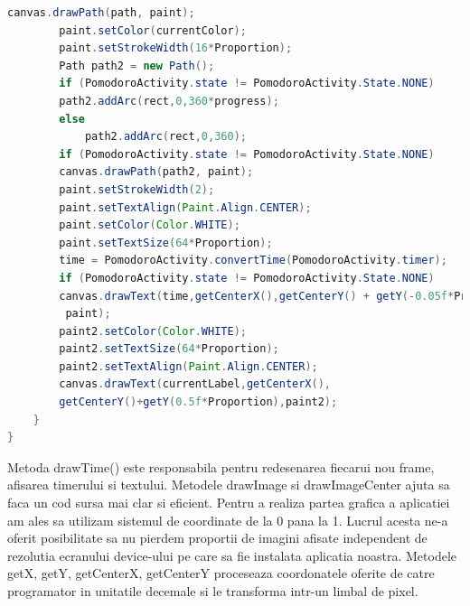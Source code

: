 \documentclass[12pt]{article}
\begin{document}
\begin{lstlisting}[language=java, caption={Fisierul TimeControl.java}, label=list2]
        canvas.drawPath(path, paint);
        paint.setColor(currentColor);
        paint.setStrokeWidth(16*Proportion);
        Path path2 = new Path();
        if (PomodoroActivity.state != PomodoroActivity.State.NONE)
        path2.addArc(rect,0,360*progress);
        else
            path2.addArc(rect,0,360);
        if (PomodoroActivity.state != PomodoroActivity.State.NONE)
        canvas.drawPath(path2, paint);
        paint.setStrokeWidth(2);
        paint.setTextAlign(Paint.Align.CENTER);
        paint.setColor(Color.WHITE);
        paint.setTextSize(64*Proportion);
        time = PomodoroActivity.convertTime(PomodoroActivity.timer);
        if (PomodoroActivity.state != PomodoroActivity.State.NONE)
        canvas.drawText(time,getCenterX(),getCenterY() + getY(-0.05f*Proportion),
         paint);
        paint2.setColor(Color.WHITE);
        paint2.setTextSize(64*Proportion);
        paint2.setTextAlign(Paint.Align.CENTER);
        canvas.drawText(currentLabel,getCenterX(), 
        getCenterY()+getY(0.5f*Proportion),paint2);
    }
}
\end{lstlisting}
Metoda drawTime() este responsabila pentru redesenarea fiecarui nou frame, afisarea timerului si textului. Metodele drawImage si drawImageCenter ajuta sa faca un cod sursa mai clar si eficient. Pentru a realiza partea grafica a aplicatiei am ales sa utilizam sistemul de coordinate de la 0 pana la 1. Lucrul acesta ne-a oferit posibilitate sa nu pierdem proportii de imagini afisate independent de rezolutia ecranului device-ului pe care sa fie instalata aplicatia noastra. Metodele getX, getY, getCenterX, getCenterY proceseaza coordonatele oferite de catre programator in unitatile decemale si le transforma intr-un limbal de pixel.
\end{document}
